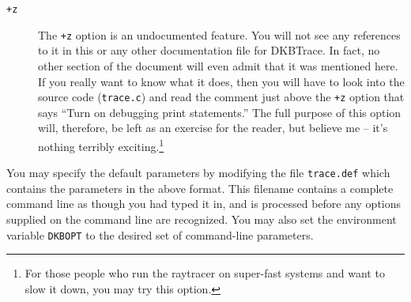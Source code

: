 \begin{description}
\item[{\tt +z}] The {\tt +z} option is
an undocumented feature.
You will not see any references to it in this or any other
documentation file for DKBTrace.  In fact, no other section of the
document will even admit that it was mentioned here. If you really
want to know what it does, then you will have to look into the source
code ({\tt trace.c}) and read the comment just above the {\tt +z}
option that says
``Turn on debugging print statements.''  The full purpose of this option
will, therefore, be left as an exercise for the reader, but believe me
-- it's nothing terribly exciting.\footnote{For those people who run
the raytracer on super-fast systems and want to slow it down, you may
try this option.}
\end{description}

You may specify the default parameters by modifying the file
{\tt trace.def}
which contains the parameters in the above format. 
This filename contains a complete command line as though you 
had typed it in, and is processed before any options supplied
on the command line are recognized. You may also set the environment
variable
{\tt DKBOPT}
to the desired set of command-line parameters.

